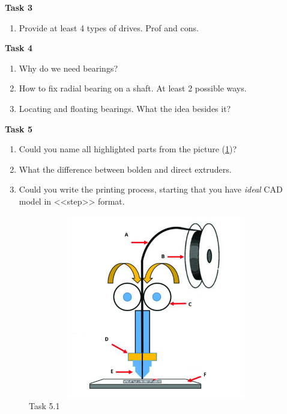 \documentclass[12pt]{article}
\newcommand\pic[1]{(\cref{#1})} %
\begin{document}
\textbf{Task 3}
\begin{enumerate}
    \item Provide at least 4 types of drives. Prof and cons.
\end{enumerate}

\textbf{Task 4}
\begin{enumerate}
    \item Why do we need bearings?
    \item How to fix radial bearing on a shaft. At least 2 possible ways.
    \item Locating and floating bearings. What the idea besides it?
\end{enumerate}

\textbf{Task 5}
\begin{enumerate}
    \item Could you name all highlighted parts from the picture \pic{fig:resources_quiz_1/quiz1_task5.png}?
    \item What the difference between bolden and direct extruders.
    \item Could you write the printing process, starting that you have \textit{ideal} CAD model in <<step>> format.  
\end{enumerate}
\begin{figure}[H]
    \centering\includegraphics[height=8cm,width=1\textwidth,keepaspectratio]{resources_quiz_1/quiz1_task5.png}
    \caption{Task 5.1}
    \label{fig:resources_quiz_1/quiz1_task5.png}
\end{figure}
\end{document}

